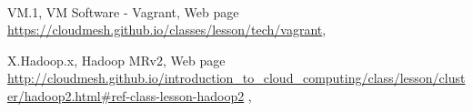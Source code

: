 \FILENAME\

VM.1, VM Software - Vagrant, Web page
\url{https://cloudmesh.github.io/classes/lesson/tech/vagrant}, 

X.Hadoop.x, Hadoop MRv2, Web page \url{http://cloudmesh.github.io/introduction_to_cloud_computing/class/lesson/cluster/hadoop2.html#ref-class-lesson-hadoop2} ,


